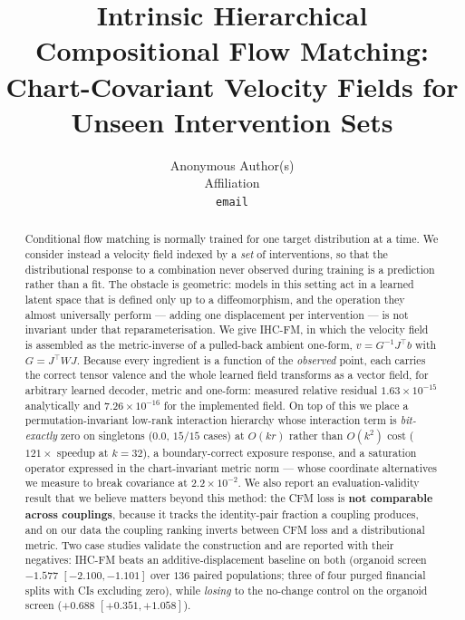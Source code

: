\documentclass{article}
\title{Intrinsic Hierarchical Compositional Flow Matching:\\
Chart-Covariant Velocity Fields for Unseen Intervention Sets}
\author{%
  Anonymous Author(s)\\
  Affiliation\\
  \texttt{email}
}
\begin{document}
\maketitle

\begin{abstract}
Conditional flow matching is normally trained for one target distribution at a time. We
consider instead a velocity field indexed by a \emph{set} of interventions, so that the
distributional response to a combination never observed during training is a prediction
rather than a fit. The obstacle is geometric: models in this setting act in a learned
latent space that is defined only up to a diffeomorphism, and the operation they almost
universally perform --- adding one displacement per intervention --- is not invariant under
that reparameterisation. We give IHC-FM, in which the velocity field is assembled as the
metric-inverse of a pulled-back ambient one-form, $v = G^{-1}J^{\top}b$ with
$G = J^{\top}W J$. Because every ingredient is a function of the \emph{observed} point,
each carries the correct tensor valence and the whole learned field transforms as a vector
field, for arbitrary learned decoder, metric and one-form: measured relative residual
$1.63\times10^{-15}$ analytically and $7.26\times10^{-16}$ for the implemented field. On top
of this we place a permutation-invariant low-rank interaction hierarchy whose interaction
term is \emph{bit-exactly} zero on singletons ($0.0$, $15/15$ cases) at $O(kr)$ rather than
$O(k^{2})$ cost ($121\times$ speedup at $k{=}32$), a boundary-correct exposure response, and
a saturation operator expressed in the chart-invariant metric norm --- whose coordinate
alternatives we measure to break covariance at $2.2\times10^{-2}$. We also report an
evaluation-validity result that we believe matters beyond this method: the CFM loss is
\textbf{not comparable across couplings}, because it tracks the identity-pair fraction a
coupling produces, and on our data the coupling ranking inverts between CFM loss and a
distributional metric. Two case studies validate the construction and are reported with
their negatives: IHC-FM beats an additive-displacement baseline on both
(organoid screen $-1.577$ $[-2.100, -1.101]$ over $136$ paired populations; three of four
purged financial splits with CIs excluding zero), while \emph{losing} to the no-change
control on the organoid screen ($+0.688$ $[+0.351, +1.058]$).
\end{abstract}

\end{document}
